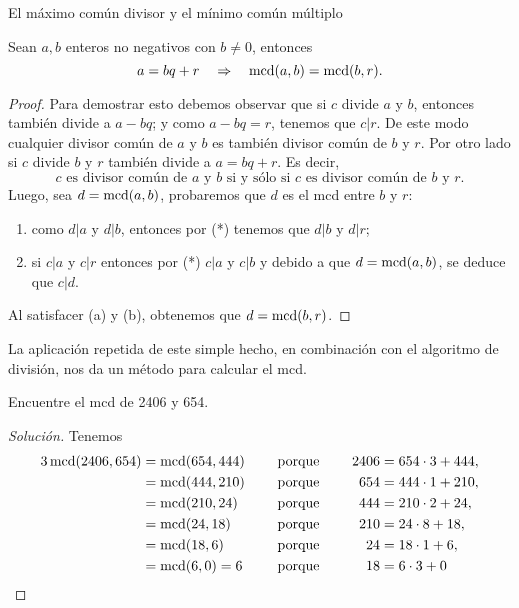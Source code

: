 \begin{section}{El máximo común divisor y el mínimo común
múltiplo}
\begin{proposicion}\label{prop-alg-eucl} Sean  $a,b$ enteros no negativos con $b \not=0$, entonces 
	\begin{equation}\label{bec}
	a=bq+r\quad \Rightarrow \quad\operatorname{mcd}(a,b)=\operatorname{mcd}(b,r).
	\end{equation}
\end{proposicion}
\begin{proof}
	Para demostrar esto debemos observar que si $c$ divide $a$ y $b$, entonces también divide a $a-bq$; y como $a-bq=r$, tenemos que $c|r$. De este modo cualquier divisor común de $a$ y $b$ es también divisor común de $b$ y $r$.  Por otro lado si $c$ divide $b$ y $r$ también divide a $a=bq+r$. Es decir, 
	\begin{equation}\label{eqmcd1}
	\text{$c$ es divisor común de $a$ y $b$ si y sólo si $c$ es divisor común de $b$ y $r$.} \tag{*}
	\end{equation}
	Luego, sea $d = \operatorname{mcd}(a,b)$, probaremos que $d$ es el mcd entre $b$ y $r$:
	\begin{enumerate}[label=(\alph*)]
		\item como $d|a$ y $d|b$, entonces por (*) tenemos que $ d|b$ y $d|r$;
		\item si $c|a $ y $c|r$ entonces por (*)  $c|a$ y $c|b$ y debido a que $d = \operatorname{mcd}(a,b)$, se deduce que $c|d$.
	\end{enumerate}
	Al satisfacer ({a}) y ({b}), obtenemos que $d = \operatorname{mcd}(b,r)$.
\end{proof}

La aplicación repetida de este simple hecho, en combinación con el algoritmo de división, nos da un método para calcular el mcd.

\begin{ejemplo} Encuentre el mcd de 2406 y 654.
\end{ejemplo}
\begin{proof}[Solución] Tenemos
	\begin{alignat*}3
	\mcd(2406,654)&=\mcd(654,444)&\quad &\text{ porque }\quad& 2406&=654\cdot3+444,\\
	&=\mcd(444,210)& &\text{ porque }\quad& 654&=444\cdot1+210,\\
	&=\mcd(210,24)&& \text{ porque }\quad &444&=210\cdot2+24,\\
	&=\mcd(24,18) && \text{ porque }\quad &210&=24\cdot8+18,\\
	&=\mcd(18,6)  && \text{ porque }\quad &24 &=18\cdot1+6,\\
	& =\mcd(6,0) = 6           &&\text{ porque }\quad&18&=6\cdot3 + 0
	\end{alignat*}
	

\end{proof}
\end{section}
